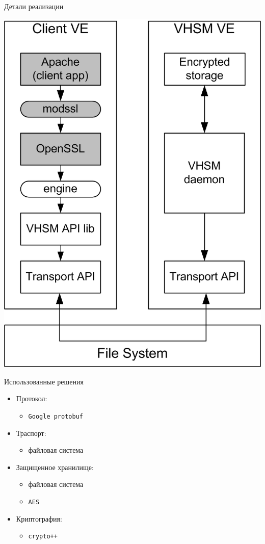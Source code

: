 \documentclass[utf8, 11pt]{beamer}
\begin{document}
\begin{frame}{Детали реализации}
\begin{center}
\includegraphics[scale=0.7]{img3-1}
\end{center}
\end{frame}

\begin{frame}{Использованные решения}
\begin{itemize}
\item Протокол:
	\begin{itemize}
	\item \texttt{Google protobuf}
	\end{itemize}
\item Траспорт:
	\begin{itemize}
	\item файловая система
	\end{itemize}
\item Защищенное хранилище:
	\begin{itemize}
	\item файловая система
	\item \texttt{AES}
	\end{itemize}
\item Криптография:
	\begin{itemize}
	\item \texttt{crypto++}
	\end{itemize}
\end{itemize}

\vspace*{\fill}
	
\end{frame}
\end{document}
